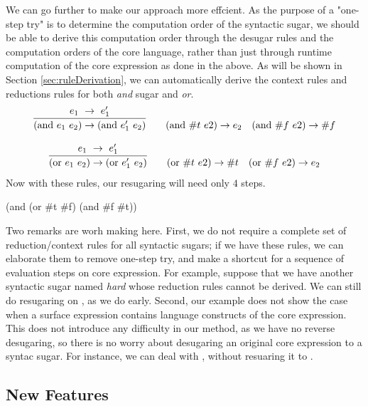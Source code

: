 We can go further to make our approach more effcient. As the purpose of a "one-step try" is to determine the computation order of the syntactic sugar, we should be able to derive this computation order through the desugar rules and the computation orders of the core language, rather than just through runtime computation of the core expression as done in the above. As will be shown in Section \ref{sec:ruleDerivation}, we can automatically derive the context rules and reductions rules for both \emph{and} sugar and \emph{or}.
\[
\begin{array}{c}
\infer {(\mbox{and}~e_1~e_2) \rightarrow (\mbox{and}~e_1'~e_2)} {e_1~ \rightarrow~e_1'}
\qquad
(\mbox{and}~\#t~e2) \rightarrow e_2
\quad
(\mbox{and}~\#f~e2) \rightarrow \#f \\
\\
\infer {(\mbox{or}~e_1~e_2) \rightarrow (\mbox{or}~e_1'~e_2)} {e_1~ \rightarrow~e_1'}
\qquad
(\mbox{or}~\#t~e2) \rightarrow \#t
\quad
(\mbox{or}~\#f~e2) \rightarrow e_2 \\
\end{array}
\]
Now with these rules, our resugaring will need only $4$ steps.
\begin{Codes}
    (and (or \#t \#f) (and \#f \#t))
\end{Codes}

Two remarks are worh making here. First, we do not require a complete set of reduction/context rules for all syntactic sugars; if we have these rules, we can elaborate them to remove one-step try, and make a shortcut for a sequence of evaluation steps on core expression.
For example, suppose that we have another syntactic sugar named \emph{hard} whose reduction rules cannot be derived.
We can still do resugaring on , as we do early.
Second, our example does not show the case when a surface expression contains language constructs of the core expression. This does not introduce any difficulty in our method, as we have no reverse desugaring, so there is no worry about desugaring an original core expression to a syntac sugar. For instance, we can deal with , without resuaring it to .


\subsection{New Features}

